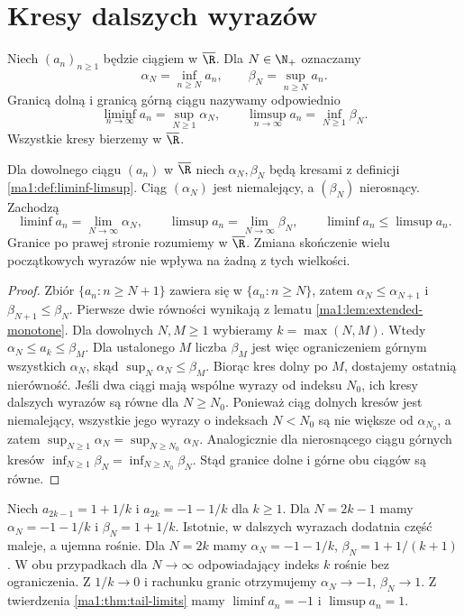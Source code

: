 \section{Kresy dalszych wyrazów}
\begin{definicja}
\label{ma1:def:liminf-limsup}
Niech $(a_n)_{n\ge1}$ będzie ciągiem w $\overline{\R}$. Dla $N\in\N_+$ oznaczamy
\[
 \alpha_N=\inf_{n\ge N}a_n,\qquad \beta_N=\sup_{n\ge N}a_n.
\]
Granicą dolną i granicą górną ciągu nazywamy odpowiednio
\[
 \liminf_{n\to\infty}a_n=\sup_{N\ge1}\alpha_N,\qquad
 \limsup_{n\to\infty}a_n=\inf_{N\ge1}\beta_N.
\]
Wszystkie kresy bierzemy w $\overline{\R}$.
\end{definicja}
\begin{twierdzenie}
\label{ma1:thm:tail-limits}
Dla dowolnego ciągu $(a_n)$ w $\overline{\R}$ niech $\alpha_N,\beta_N$ będą kresami z definicji \ref{ma1:def:liminf-limsup}. Ciąg $(\alpha_N)$ jest niemalejący, a $(\beta_N)$ nierosnący. Zachodzą
\[
 \liminf a_n=\lim_{N\to\infty}\alpha_N,\qquad
 \limsup a_n=\lim_{N\to\infty}\beta_N,\qquad
 \liminf a_n\le\limsup a_n.
\]
Granice po prawej stronie rozumiemy w $\overline{\R}$. Zmiana skończenie wielu początkowych wyrazów nie wpływa na żadną z tych wielkości.
\end{twierdzenie}
\begin{proof}
Zbiór $\{a_n:n\ge N+1\}$ zawiera się w $\{a_n:n\ge N\}$, zatem $\alpha_N\le\alpha_{N+1}$ i $\beta_{N+1}\le\beta_N$. Pierwsze dwie równości wynikają z lematu \ref{ma1:lem:extended-monotone}.
Dla dowolnych $N,M\ge1$ wybieramy $k=\max(N,M)$. Wtedy $\alpha_N\le a_k\le\beta_M$. Dla ustalonego $M$ liczba $\beta_M$ jest więc ograniczeniem górnym wszystkich $\alpha_N$, skąd $\sup_N\alpha_N\le\beta_M$. Biorąc kres dolny po $M$, dostajemy ostatnią nierówność.
Jeśli dwa ciągi mają wspólne wyrazy od indeksu $N_0$, ich kresy dalszych wyrazów są równe dla $N\ge N_0$. Ponieważ ciąg dolnych kresów jest niemalejący, wszystkie jego wyrazy o indeksach $N<N_0$ są nie większe od $\alpha_{N_0}$, a zatem $\sup_{N\ge1}\alpha_N=\sup_{N\ge N_0}\alpha_N$. Analogicznie dla nierosnącego ciągu górnych kresów $\inf_{N\ge1}\beta_N=\inf_{N\ge N_0}\beta_N$. Stąd granice dolne i górne obu ciągów są równe.
\end{proof}

\begin{przyklad}
\label{ma1:ex:oscillating-limits}
Niech $a_{2k-1}=1+1/k$ i $a_{2k}=-1-1/k$ dla $k\ge1$. Dla $N=2k-1$ mamy $\alpha_N=-1-1/k$ i $\beta_N=1+1/k$. Istotnie, w dalszych wyrazach dodatnia część maleje, a ujemna rośnie. Dla $N=2k$ mamy $\alpha_N=-1-1/k$, $\beta_N=1+1/(k+1)$. W obu przypadkach dla $N\to\infty$ odpowiadający indeks $k$ rośnie bez ograniczenia. Z $1/k\to0$ i rachunku granic otrzymujemy $\alpha_N\to-1$, $\beta_N\to1$. Z twierdzenia \ref{ma1:thm:tail-limits} mamy $\liminf a_n=-1$ i $\limsup a_n=1$.
\end{przyklad}

